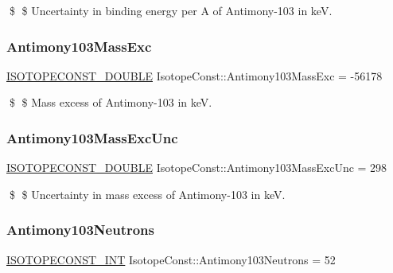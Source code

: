 \$ \$ Uncertainty in binding energy per A of Antimony-\/103 in keV. \mbox{\label{group___isotope_const-_antimony-_sb103_gaaa7b7b76e1c26009fdbb6336d788c717}} 
\subsubsection{\texorpdfstring{Antimony103\+Mass\+Exc}{Antimony103MassExc}}
{\footnotesize\ttfamily \mbox{\hyperlink{group___isotope_const-_macros_ga8f45a7272ce02c0b4c65c44636ed719a}{I\+S\+O\+T\+O\+P\+E\+C\+O\+N\+S\+T\+\_\+\+D\+O\+U\+B\+LE}} Isotope\+Const\+::\+Antimony103\+Mass\+Exc = -\/56178}

\$ \$ Mass excess of Antimony-\/103 in keV. \mbox{\label{group___isotope_const-_antimony-_sb103_ga2b6cd43c04781f1af37d20fb25e17804}} 
\subsubsection{\texorpdfstring{Antimony103\+Mass\+Exc\+Unc}{Antimony103MassExcUnc}}
{\footnotesize\ttfamily \mbox{\hyperlink{group___isotope_const-_macros_ga8f45a7272ce02c0b4c65c44636ed719a}{I\+S\+O\+T\+O\+P\+E\+C\+O\+N\+S\+T\+\_\+\+D\+O\+U\+B\+LE}} Isotope\+Const\+::\+Antimony103\+Mass\+Exc\+Unc = 298}

\$ \$ Uncertainty in mass excess of Antimony-\/103 in keV. \mbox{\label{group___isotope_const-_antimony-_sb103_ga89cf8788ffdbcf34f563fff67e295ffc}} 
\subsubsection{\texorpdfstring{Antimony103\+Neutrons}{Antimony103Neutrons}}
{\footnotesize\ttfamily \mbox{\hyperlink{group___isotope_const-_macros_ga5f18360b3e99483a35c32d789e62621c}{I\+S\+O\+T\+O\+P\+E\+C\+O\+N\+S\+T\+\_\+\+I\+NT}} Isotope\+Const\+::\+Antimony103\+Neutrons = 52}

